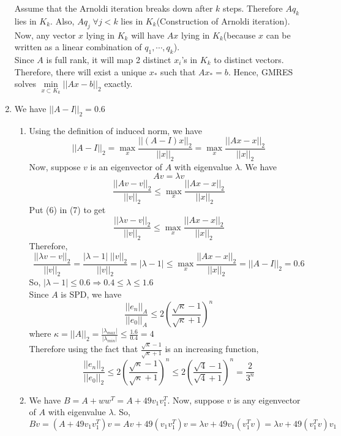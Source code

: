 \documentclass{article}
\begin{document}
\begin{enumerate}
    Assume that the Arnoldi iteration breaks down after $k$ steps. Therefore $Aq_k$ lies in $K_k$. Also, $Aq_j \; \forall j < k$ lies in $K_k$(Construction of Arnoldi iteration). Now, any vector $x$ lying in $K_k$ will have $Ax$ lying in $K_k$(because $x$ can be written as a linear combination of $q_1, \cdots, q_k$).\\
    Since $A$ is full rank, it will map 2 distinct $x_i$'s in $K_k$ to distinct vectors. Therefore, there will exist a unique $x_*$ such that $Ax_* = b$. Hence, GMRES solves $\min\limits_{x \subset K_k}||Ax - b||_2$ exactly.
    \clearpage
    \item We have $||A - I||_2 = 0.6$
    \begin{enumerate}[label=(\alph*)]
        \item Using the definition of induced norm, we have
        $$||A - I||_2 = \max_x \frac{||(A - I)x||_2}{||x||_2} = \max_x\frac{||Ax - x||_2}{||x||_2}$$
        Now, suppose $v$ is an eigenvector of $A$ with eigenvalue $\lambda$. We have
        \begin{equation}
        Av = \lambda v
        \end{equation}
        \begin{equation}
        \frac{||Av - v||_2}{||v||_2} \leq \max_x\frac{||Ax - x||_2}{||x||_2}
        \end{equation}
        Put (6) in (7) to get
        $$\frac{||\lambda v - v||_2}{||v||_2} \leq \max_x\frac{||Ax - x||_2}{||x||_2}$$
        Therefore,
        $$\frac{||\lambda v - v||_2}{||v||_2} = \frac{|\lambda - 1|\;||v||_2}{||v||_2} = |\lambda - 1| \leq \max_x\frac{||Ax - x||_2}{||x||_2} = ||A - I||_2 = 0.6$$
        So, $|\lambda - 1| \leq 0.6 \Rightarrow 0.4 \leq \lambda \leq 1.6$\\
        Since $A$ is SPD, we have
        $$\frac{||e_n||_A}{||e_0||_A} \leq 2 (\frac{\sqrt{\kappa} - 1}{\sqrt{\kappa} + 1})^n$$
        where $\kappa = ||A||_2 = \frac{|\lambda_{max}|}{|\lambda_{min}|} \leq \frac{1.6}{0.4} = 4$\\
        Therefore using the fact that $\frac{\sqrt{\kappa} - 1}{\sqrt{\kappa} + 1}$ is an increasing function,
        $$\frac{||e_n||_2}{||e_0||_2} \leq 2 (\frac{\sqrt{\kappa} - 1}{\sqrt{\kappa} + 1})^n \leq 2 (\frac{\sqrt{4} - 1}{\sqrt{4} + 1})^n = \frac{2}{3^n}$$
        \item We have $B = A + ww^T = A + 49v_1v_1^T$. Now, suppose $v$ is any eigenvector of $A$ with eigenvalue $\lambda$. So,
        $$Bv = (A + 49v_1v_1^T)v = Av + 49(v_1v_1^T)v = \lambda v + 49v_1(v_1^Tv) = \lambda v + 49(v_1^Tv)v_1$$

\end{enumerate}
\end{enumerate}
\end{document}
